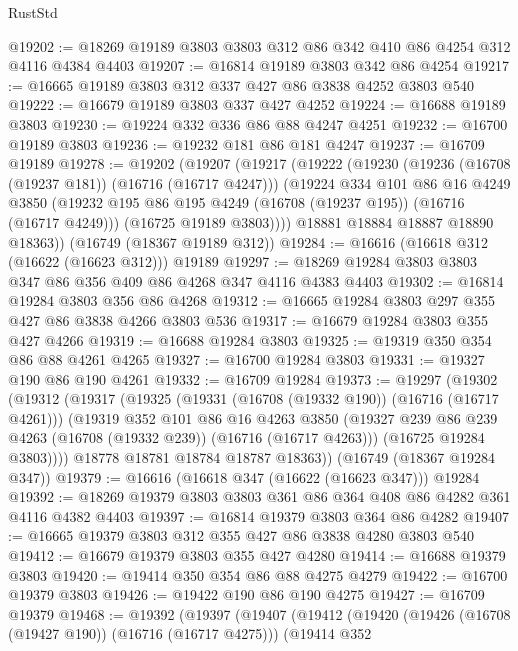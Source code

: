 \begin{lexlean}{RustStd}
\begin{coremodule}
@19202 := @18269 @19189 @3803 @3803 @312 @86 @342 @410 @86 @4254 @312 @4116 @4384 @4403
@19207 := @16814 @19189 @3803 @342 @86 @4254
@19217 := @16665 @19189 @3803 @312 @337 @427 @86 @3838 @4252 @3803 @540
@19222 := @16679 @19189 @3803 @337 @427 @4252
@19224 := @16688 @19189 @3803
@19230 := @19224 @332 @336 @86 @88 @4247 @4251
@19232 := @16700 @19189 @3803
@19236 := @19232 @181 @86 @181 @4247
@19237 := @16709 @19189
@19278 := @19202
    (@19207
      (@19217
        (@19222
          (@19230
            (@19236 (@16708 (@19237 @181)) (@16716 (@16717 @4247)))
            (@19224
              @334
              @101
              @86
              @16
              @4249
              @3850
              (@19232 @195 @86 @195 @4249 (@16708 (@19237 @195)) (@16716 (@16717 @4249)))
              (@16725 @19189 @3803))))
        @18881
        @18884
        @18887
        @18890
        @18363))
    (@16749 (@18367 @19189 @312))
@19284 := @16616 (@16618 @312 (@16622 (@16623 @312))) @19189
@19297 := @18269 @19284 @3803 @3803 @347 @86 @356 @409 @86 @4268 @347 @4116 @4383 @4403
@19302 := @16814 @19284 @3803 @356 @86 @4268
@19312 := @16665 @19284 @3803 @297 @355 @427 @86 @3838 @4266 @3803 @536
@19317 := @16679 @19284 @3803 @355 @427 @4266
@19319 := @16688 @19284 @3803
@19325 := @19319 @350 @354 @86 @88 @4261 @4265
@19327 := @16700 @19284 @3803
@19331 := @19327 @190 @86 @190 @4261
@19332 := @16709 @19284
@19373 := @19297
    (@19302
      (@19312
        (@19317
          (@19325
            (@19331 (@16708 (@19332 @190)) (@16716 (@16717 @4261)))
            (@19319
              @352
              @101
              @86
              @16
              @4263
              @3850
              (@19327 @239 @86 @239 @4263 (@16708 (@19332 @239)) (@16716 (@16717 @4263)))
              (@16725 @19284 @3803))))
        @18778
        @18781
        @18784
        @18787
        @18363))
    (@16749 (@18367 @19284 @347))
@19379 := @16616 (@16618 @347 (@16622 (@16623 @347))) @19284
@19392 := @18269 @19379 @3803 @3803 @361 @86 @364 @408 @86 @4282 @361 @4116 @4382 @4403
@19397 := @16814 @19379 @3803 @364 @86 @4282
@19407 := @16665 @19379 @3803 @312 @355 @427 @86 @3838 @4280 @3803 @540
@19412 := @16679 @19379 @3803 @355 @427 @4280
@19414 := @16688 @19379 @3803
@19420 := @19414 @350 @354 @86 @88 @4275 @4279
@19422 := @16700 @19379 @3803
@19426 := @19422 @190 @86 @190 @4275
@19427 := @16709 @19379
@19468 := @19392
    (@19397
      (@19407
        (@19412
          (@19420
            (@19426 (@16708 (@19427 @190)) (@16716 (@16717 @4275)))
            (@19414
              @352

\end{coremodule}
\end{lexlean}

